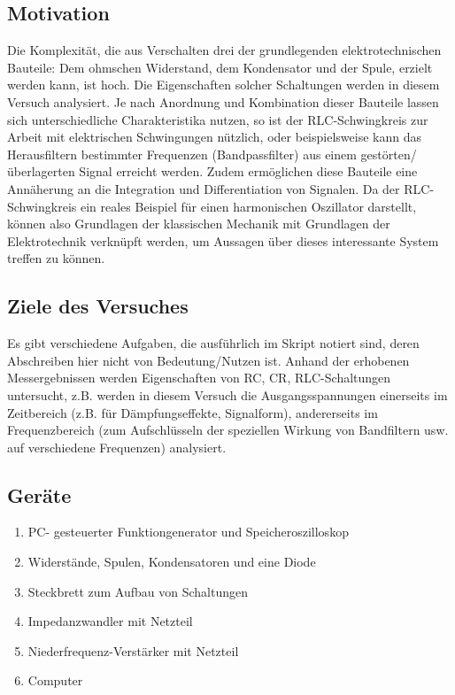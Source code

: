 \subsection{Motivation}
Die Komplexität, die aus Verschalten drei der grundlegenden elektrotechnischen Bauteile: Dem ohmschen Widerstand, dem Kondensator und der Spule, erzielt werden kann, ist hoch. Die Eigenschaften solcher Schaltungen werden in diesem Versuch analysiert. Je nach Anordnung und Kombination dieser Bauteile lassen sich unterschiedliche Charakteristika nutzen, so ist der RLC-Schwingkreis zur Arbeit mit elektrischen Schwingungen nützlich, oder beispielsweise kann das Herausfiltern bestimmter Frequenzen (Bandpassfilter) aus einem gestörten/überlagerten Signal erreicht werden. Zudem ermöglichen diese Bauteile eine Annäherung an die Integration und Differentiation von Signalen. 
Da der RLC-Schwingkreis ein reales Beispiel für einen harmonischen Oszillator darstellt, können also Grundlagen der klassischen Mechanik mit Grundlagen der Elektrotechnik verknüpft werden, um Aussagen über dieses interessante System treffen zu können.

\subsection{Ziele des Versuches}
Es gibt verschiedene Aufgaben, die ausführlich im Skript\autocite{Skript_2.2} notiert sind, deren Abschreiben hier nicht von Bedeutung/Nutzen ist. Anhand der erhobenen Messergebnissen werden Eigenschaften von RC, CR, RLC-Schaltungen untersucht, z.B. werden in diesem Versuch die Ausgangsspannungen einerseits im Zeitbereich (z.B. für Dämpfungseffekte, Signalform), andererseits im Frequenzbereich (zum Aufschlüsseln der speziellen Wirkung von Bandfiltern usw. auf verschiedene Frequenzen) analysiert.

\subsection{Geräte}
\begin{enumerate}
    \item PC- gesteuerter Funktiongenerator und Speicheroszilloskop
    \item Widerstände, Spulen, Kondensatoren und eine Diode
    \item Steckbrett zum Aufbau von Schaltungen
    \item Impedanzwandler mit Netzteil
    \item Niederfrequenz-Verstärker mit Netzteil
    \item Computer
\end{enumerate}

